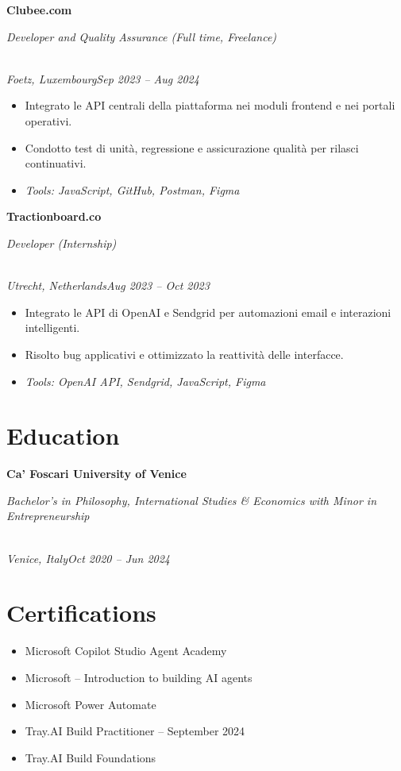 \documentclass[a4paper,10pt]{article}
\newcommand{\role}[4]{\vspace{3pt}\noindent\hspace{0.6em}\parbox[t]{0.38\textwidth}{\raggedright\textbf{#1}}\hfill\parbox[t]{0.58\textwidth}{\raggedleft\textit{#2}}\\{\textit{#3}\hfill\textit{#4}}\vspace{1pt}}
\begin{document}
\role{Clubee.com}{Developer and Quality Assurance (Full time, Freelance)}{Foetz, Luxembourg}{Sep 2023 -- Aug 2024}
\begin{itemize}
\item Integrato le API centrali della piattaforma nei moduli frontend e nei portali operativi.
\item Condotto test di unità, regressione e assicurazione qualità per rilasci continuativi.
\item \textit{Tools: JavaScript, GitHub, Postman, Figma}
\end{itemize}

\role{Tractionboard.co}{Developer (Internship)}{Utrecht, Netherlands}{Aug 2023 -- Oct 2023}
\begin{itemize}
\item Integrato le API di OpenAI e Sendgrid per automazioni email e interazioni intelligenti.
\item Risolto bug applicativi e ottimizzato la reattività delle interfacce.
\item \textit{Tools: OpenAI API, Sendgrid, JavaScript, Figma}
\end{itemize}

\section{Education}
\role{Ca' Foscari University of Venice}{Bachelor's in Philosophy, International Studies \& Economics with Minor in Entrepreneurship}{Venice, Italy}{Oct 2020 -- Jun 2024}

\section{Certifications}
\begin{itemize}
\item Microsoft Copilot Studio Agent Academy
\item Microsoft -- Introduction to building AI agents
\item Microsoft Power Automate
\item Tray.AI Build Practitioner -- September 2024
\item Tray.AI Build Foundations
\end{itemize}
\end{document}
